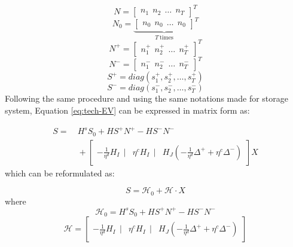\begin{equation*}
N = \begin{bmatrix}
n_1~~n_2~~\dots~~n_T
\end{bmatrix}^T
\end{equation*}
\begin{equation*}
N_0 = {\underbrace{\begin{bmatrix}
	n_0~~n_0~~ \dots~~n_0
	\end{bmatrix}}_{T~\text{times}}}^T
\end{equation*}
\begin{equation*}
N^+ = \begin{bmatrix}
n_1^+~~n_2^+~~\dots~~n_T^+
\end{bmatrix}^T
\end{equation*}
\begin{equation*}
N^- = \begin{bmatrix}
n_1^-~~n_2^-~~\dots~~n_T^-
\end{bmatrix}^T
\end{equation*}
\begin{equation*}
S^+ = diag(s_1^+, s_2^+, \dots, s_T^+
)
\end{equation*}
\begin{equation*}
S^- = diag(s_1^-, s_2^-, \dots, s_T^-)
\end{equation*}
\newline
Following the same procedure and using the same notations made for storage system, Equation \eqref{eq:tech-EV} can be expressed in matrix form as:

\begin{equation}
\begin{aligned}
S = &~ H^s S_0 + H S^+ N^+ - H S^- N^- \\
&~+ \begin{bmatrix}
-\frac{1}{\eta^d} H_I~~|& \eta^c H_I~~|& H_J (-\frac{1}{\eta^d} \Delta^{+} + \eta^c \Delta^{-})
\end{bmatrix} X
\end{aligned}
\end{equation}
which can be reformulated as:

\begin{equation}
\label{eq:state-EV-M-1}
S = \mathcal{H}_0 + \mathcal{H} \cdot X
\end{equation}
where
\begin{equation}
\mathcal{H}_0 = H^s S_0 + H S^+ N^+ - H S^- N^-
\end{equation}
\begin{equation}
\label{eq:state-EV-M-3}
\mathcal{H}  = \begin{bmatrix}
-\frac{1}{\eta^d} H_I~~|& \eta^c H_I~~|& H_J (-\frac{1}{\eta^d} \Delta^{+} + \eta^c \Delta^{-})
\end{bmatrix}
\end{equation}
